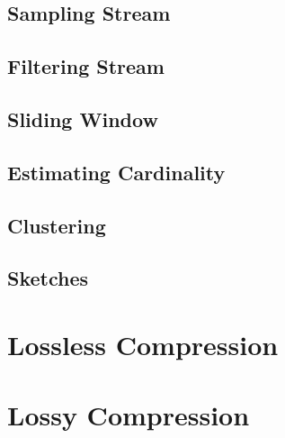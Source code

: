 \begin{quote}
\begin{itemize}
\begin{comment}
    \item \textbf{Wavelet coefficients} are projections of the given signal (set of data values) onto an orthogonal set of basis vectors. The coefficients have the desirable property that the signal reconstructed from the top few wavelet coefficients best approximates the original signal in terms of the L2 norm~\cite{gilbert2002fast}. The choice of basis vectors determines the type of wavelets.
\end{comment}

\end{itemize}
\end{quote}

\subsection{Sampling Stream}

\subsection{Filtering Stream}

\subsection{Sliding Window}

\subsection{Estimating Cardinality}

\subsection{Clustering}

\subsection{Sketches}

\section{Lossless Compression}


\section{Lossy Compression}
